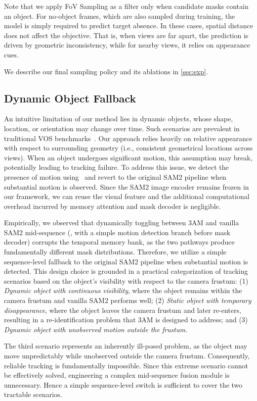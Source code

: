Note that we apply FoV Sampling as a filter only when candidate masks contain an object. For no-object frames, which are also sampled during training, the model is simply required to predict target absence. In these cases, spatial distance does not affect the objective. That is, when views are far apart, the prediction is driven by geometric inconsistency, while for nearby views, it relies on appearance cues.

We describe our final sampling policy and its ablations in \cref{sec:exp}.

\vspace{-0.5em}
\subsection{Dynamic Object Fallback}
\vspace{-0.5em}
An intuitive limitation of our method lies in dynamic objects, whose shape, location, or orientation may change over time. Such scenarios are prevalent in traditional VOS benchmarks~\cite{perazzi2017davis, xu2018youtube, fan2019lasot}. 
Our approach relies heavily on relative appearance with respect to surrounding geometry (i.e., consistent geometrical locations across views). 
When an object undergoes significant motion, this assumption may break, potentially leading to tracking failure.
To address this issue, we detect the presence of motion using~\cite{Huang_2025_seganymotion} and revert to the original SAM2 pipeline when substantial motion is observed. 
Since the SAM2 image encoder remains frozen in our framework, we can reuse the visual feature and the additional computational overhead incurred by memory attention and mask decoder is negligible.

Empirically, we observed that dynamically toggling between 3AM and vanilla SAM2 mid-sequence (\eg, with a simple motion detection branch before mask decoder) corrupts the temporal memory bank, as the two pathways produce fundamentally different mask distributions. Therefore, we utilize a simple sequence-level fallback to the original SAM2 pipeline when substantial motion is detected. 
This design choice is grounded in a practical categorization of tracking scenarios based on the object's 
visibility with respect to the camera frustum: 
(1) \textit{Dynamic object with continuous visibility}, where the object remains within the camera frustum and 
vanilla SAM2 performs well; 
(2) \textit{Static object with temporary disappearance}, where the object leaves the camera frustum and later 
re-enters, resulting in a re-identification problem that 3AM is designed to address; and 
(3) \textit{Dynamic object with unobserved motion outside the frustum}. 

The third scenario represents an inherently ill-posed problem, as the object may move unpredictably while 
unobserved outside the camera frustum. Consequently, reliable tracking is fundamentally impossible. Since this 
extreme scenario cannot be effectively solved, engineering a complex mid-sequence fusion module is unnecessary. 
Hence a simple sequence-level switch is sufficient to cover the two tractable scenarios.